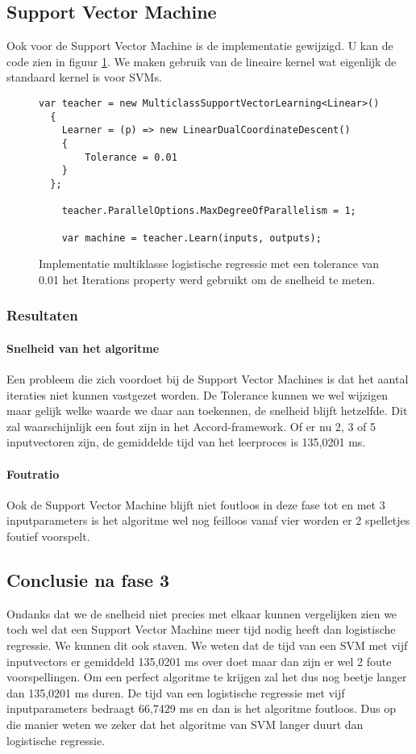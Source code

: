\newpage
\subsection{Support Vector Machine}
\label{sec:supportvectormachineFase3}
Ook voor de Support Vector Machine is de implementatie gewijzigd. U kan de code zien in figuur \ref{code:svmFase1imp}. We maken gebruik van de lineaire kernel wat eigenlijk de standaard kernel is voor SVMs.
\begin{figure}[]
	\renewcommand{\figurename}{Code}
	\begin{lstlisting}
var teacher = new MulticlassSupportVectorLearning<Linear>()
  {
    Learner = (p) => new LinearDualCoordinateDescent()
    {
        Tolerance = 0.01
    }
  };

    teacher.ParallelOptions.MaxDegreeOfParallelism = 1;

    var machine = teacher.Learn(inputs, outputs);
	\end{lstlisting}
	\caption{Implementatie multiklasse logistische regressie met een tolerance van 0.01 het Iterations property werd gebruikt om de snelheid te meten.}
	\label{code:svmFase1imp}
\end{figure}


\subsubsection{Resultaten}
\paragraph{Snelheid van het algoritme} 
Een probleem die zich voordoet bij de Support Vector Machines is dat het aantal iteraties niet kunnen vastgezet worden. De Tolerance kunnen we wel wijzigen maar gelijk welke waarde we daar aan toekennen, de snelheid blijft hetzelfde. Dit zal waarschijnlijk een fout zijn in het Accord-framework. Of er nu 2, 3 of 5 inputvectoren zijn, de gemiddelde tijd van het leerproces is 135,0201 ms.


\paragraph{Foutratio}
Ook de Support Vector Machine blijft niet foutloos in deze fase tot en met 3 inputparameters is het algoritme wel nog feilloos vanaf vier worden er 2 spelletjes foutief voorspelt.  

\subsection{Conclusie na fase 3}
Ondanks dat we de snelheid niet precies met elkaar kunnen vergelijken zien we toch wel dat een Support Vector Machine meer tijd nodig heeft dan logistische regressie. We kunnen dit ook staven. We weten dat de tijd van een SVM met vijf inputvectors er gemiddeld 135,0201 ms over doet maar dan zijn er wel 2 foute voorspellingen. Om een perfect algoritme te krijgen zal het dus nog beetje langer dan 135,0201 ms duren. De tijd van een logistische regressie met vijf inputparameters bedraagt 66,7429 ms en dan is het algoritme foutloos. Dus op die manier weten we zeker dat het algoritme van SVM langer duurt dan logistische regressie. 

